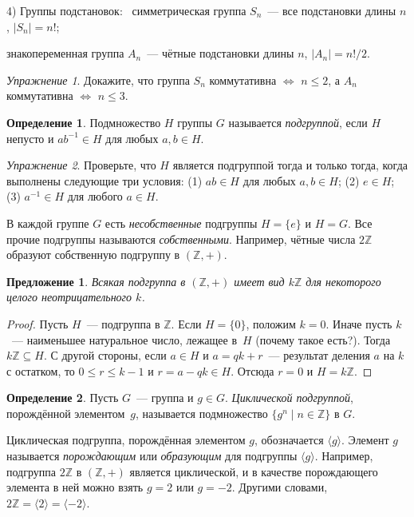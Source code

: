 \documentclass[a4paper,10pt]{amsart}
\def\ZZ{{\mathbb Z}}%
\newtheorem{proposition}{Предложение}
\theoremstyle{definition}
\newtheorem{definition}{Определение}
\theoremstyle{remark}
\newtheorem{exc}{Упражнение}
\begin{document}
4) Группы подстановок: \ симметрическая группа $S_n$~--- все
подстановки длины $n$, $|S_n|=n!$;

знакопеременная группа $A_n$~--- чётные подстановки длины $n$,
$|A_n|=n!/2$.

\begin{exc}
Докажите, что группа $S_n$ коммутативна $\Leftrightarrow$ $n
\leqslant 2$, а $A_n$ коммутативна $\Leftrightarrow$ $n \leqslant
3$.
\end{exc}

\begin{definition}
Подмножество $H$ группы $G$ называется {\it подгруппой}, если $H$ непусто и $ab^{-1}\in H$ для любых $a,b\in H$.
\end{definition}

\begin{exc}
Проверьте, что $H$ является подгруппой тогда и только тогда, когда
выполнены следующие три условия: \quad (1) $ab\in H$ для любых $a,b
\in H$; \quad (2) $e \in H$; \quad (3) $a^{-1}\in H$ для любого
$a\in H$.
\end{exc}

В каждой группе $G$ есть {\it несобственные} подгруппы $H=\{e\}$ и
$H=G$. Все прочие подгруппы называются {\it собственными}. Например,
чётные числа $2\ZZ$ образуют собственную подгруппу в $(\ZZ,+)$.

\begin{proposition} \label{sbgrz}
Всякая подгруппа в $(\ZZ,+)$ имеет вид $k\ZZ$ для некоторого целого
неотрицательного $k$.
\end{proposition}

\begin{proof}
Пусть $H$~--- подгруппа в $\ZZ$. Если $H=\{0\}$, положим $k=0$.
Иначе пусть $k$~--- наименьшее натуральное число, лежащее в~$H$
(почему такое есть?). Тогда $k\ZZ \subseteq H$. С другой стороны,
если $a\in H$ и $a=qk+r$~--- результат деления $a$ на $k$ с
остатком, то $0 \leqslant r \leqslant k-1$ и $r = a - qk \in H$.
Отсюда $r=0$ и $H=k\ZZ$.
\end{proof}

\begin{definition}
Пусть $G$~--- группа и $g\in G$. {\it Циклической подгруппой},
порождённой элементом~$g$, называется подмножество $\{g^n \mid
n\in\ZZ\}$ в $G$.
\end{definition}

Циклическая подгруппа, порождённая элементом $g$, обозначается
$\langle g\rangle$. Элемент $g$ называется {\it порождающим} или
{\it образующим} для подгруппы $\langle g\rangle$. Например,
подгруппа $2\ZZ$ в $(\ZZ,+)$ является циклической, и в качестве
порождающего элемента в ней можно взять $g=2$ или $g=-2$. Другими
словами, $2\ZZ=\langle 2\rangle=\langle -2\rangle$.
\end{document}

